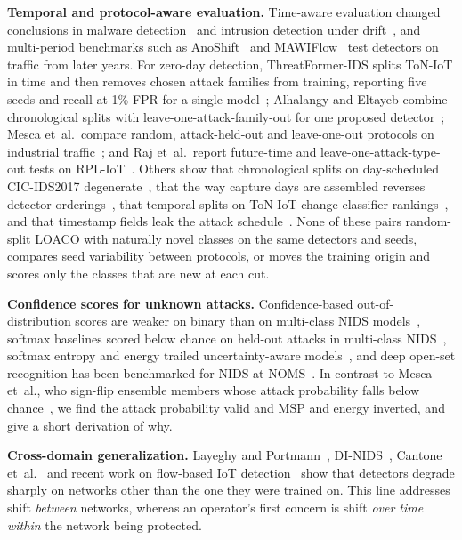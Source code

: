 \documentclass[conference]{IEEEtran}
\begin{document}
\textbf{Temporal and protocol-aware evaluation.} Time-aware evaluation changed conclusions in malware detection~\cite{pendlebury2019} and intrusion detection under drift~\cite{andresini2021}, and multi-period benchmarks such as AnoShift~\cite{dragoi2022} and MAWIFlow~\cite{schraven2026} test detectors on traffic from later years. For zero-day detection, ThreatFormer-IDS splits ToN-IoT in time and then removes chosen attack families from training, reporting five seeds and recall at 1\% FPR for a single model~\cite{nayak2026}; Alhalangy and Eltayeb combine chronological splits with leave-one-attack-family-out for one proposed detector~\cite{alhalangy2026}; Mesca et~al.\ compare random, attack-held-out and leave-one-out protocols on industrial traffic~\cite{mesca2026}; and Raj et~al.\ report future-time and leave-one-attack-type-out tests on RPL-IoT~\cite{raj2026}. Others show that chronological splits on day-scheduled CIC-IDS2017 degenerate~\cite{moczkodan2026}, that the way capture days are assembled reverses detector orderings~\cite{youssef2026}, that temporal splits on ToN-IoT change classifier rankings~\cite{abdessamad2026}, and that timestamp fields leak the attack schedule~\cite{sakr2026}. None of these pairs random-split LOACO with naturally novel classes on the same detectors and seeds, compares seed variability between protocols, or moves the training origin and scores only the classes that are new at each cut.

\textbf{Confidence scores for unknown attacks.} Confidence-based out-of-distribution scores are weaker on binary than on multi-class NIDS models~\cite{corsini2023}, softmax baselines scored below chance on held-out attacks in multi-class NIDS~\cite{zhang2021}, softmax entropy and energy trailed uncertainty-aware models~\cite{talpini2024}, and deep open-set recognition has been benchmarked for NIDS at NOMS~\cite{baye2023}. In contrast to Mesca et~al., who sign-flip ensemble members whose attack probability falls below chance~\cite{mesca2026}, we find the attack probability valid and MSP and energy inverted, and give a short derivation of why.

\textbf{Cross-domain generalization.} Layeghy and Portmann~\cite{layeghy2023xdomain}, DI-NIDS~\cite{layeghy2023dinids}, Cantone et~al.~\cite{cantone2024} and recent work on flow-based IoT detection~\cite{martinez2026} show that detectors degrade sharply on networks other than the one they were trained on. This line addresses shift \emph{between} networks, whereas an operator's first concern is shift \emph{over time within} the network being protected.
\end{document}
